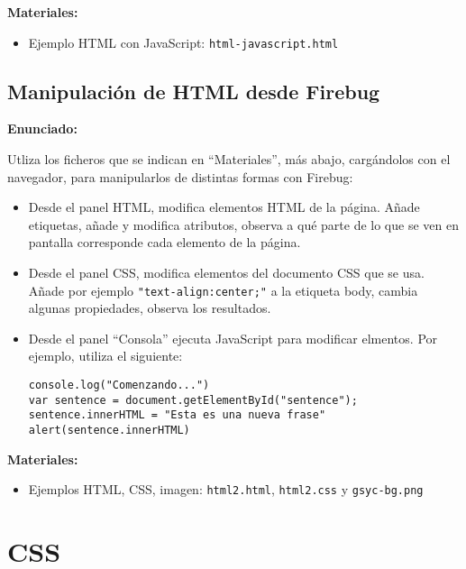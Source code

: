 \textbf{Materiales:}

\begin{itemize}
\item Ejemplo HTML con JavaScript: \verb|html-javascript.html|
\end{itemize}


\subsection{Manipulación de HTML desde Firebug}
\label{subsec:eje-html-firebug}

\textbf{Enunciado:}

Utliza los ficheros que se indican en ``Materiales'', más abajo, cargándolos con el navegador, para manipularlos de distintas formas con Firebug:

\begin{itemize}
\item Desde el panel HTML, modifica elementos HTML de la página. Añade etiquetas, añade y modifica atributos, observa a qué parte de lo que se ven en pantalla corresponde cada elemento de la página.
\item Desde el panel CSS, modifica elementos del documento CSS que se usa. Añade por ejemplo \verb|"text-align:center;"| a la etiqueta body, cambia algunas propiedades, observa los resultados.
\item Desde el panel ``Consola'' ejecuta JavaScript para modificar elmentos. Por ejemplo, utiliza el siguiente:

\begin{verbatim}
console.log("Comenzando...")
var sentence = document.getElementById("sentence");
sentence.innerHTML = "Esta es una nueva frase"
alert(sentence.innerHTML)
\end{verbatim}
\end{itemize}

\textbf{Materiales:}

\begin{itemize}
\item Ejemplos HTML, CSS, imagen:
 \verb|html2.html|, \verb|html2.css| y \verb|gsyc-bg.png|
\end{itemize}

\section{CSS}

